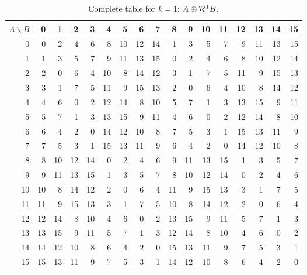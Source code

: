 \begin{table}[!htbp]\centering\small
\setlength{\tabcolsep}{5.0pt}\renewcommand{\arraystretch}{1.10}
\begin{tabular}{r|rrrrrrrrrrrrrrrr}\toprule
$A\backslash B$ & 0 & 1 & 2 & 3 & 4 & 5 & 6 & 7 & 8 & 9 & 10 & 11 & 12 & 13 & 14 & 15\\\midrule
0 & 0 & 2 & 4 & 6 & 8 & 10 & 12 & 14 & 1 & 3 & 5 & 7 & 9 & 11 & 13 & 15\\
1 & 1 & 3 & 5 & 7 & 9 & 11 & 13 & 15 & 0 & 2 & 4 & 6 & 8 & 10 & 12 & 14\\
2 & 2 & 0 & 6 & 4 & 10 & 8 & 14 & 12 & 3 & 1 & 7 & 5 & 11 & 9 & 15 & 13\\
3 & 3 & 1 & 7 & 5 & 11 & 9 & 15 & 13 & 2 & 0 & 6 & 4 & 10 & 8 & 14 & 12\\
4 & 4 & 6 & 0 & 2 & 12 & 14 & 8 & 10 & 5 & 7 & 1 & 3 & 13 & 15 & 9 & 11\\
5 & 5 & 7 & 1 & 3 & 13 & 15 & 9 & 11 & 4 & 6 & 0 & 2 & 12 & 14 & 8 & 10\\
6 & 6 & 4 & 2 & 0 & 14 & 12 & 10 & 8 & 7 & 5 & 3 & 1 & 15 & 13 & 11 & 9\\
7 & 7 & 5 & 3 & 1 & 15 & 13 & 11 & 9 & 6 & 4 & 2 & 0 & 14 & 12 & 10 & 8\\
8 & 8 & 10 & 12 & 14 & 0 & 2 & 4 & 6 & 9 & 11 & 13 & 15 & 1 & 3 & 5 & 7\\
9 & 9 & 11 & 13 & 15 & 1 & 3 & 5 & 7 & 8 & 10 & 12 & 14 & 0 & 2 & 4 & 6\\
10 & 10 & 8 & 14 & 12 & 2 & 0 & 6 & 4 & 11 & 9 & 15 & 13 & 3 & 1 & 7 & 5\\
11 & 11 & 9 & 15 & 13 & 3 & 1 & 7 & 5 & 10 & 8 & 14 & 12 & 2 & 0 & 6 & 4\\
12 & 12 & 14 & 8 & 10 & 4 & 6 & 0 & 2 & 13 & 15 & 9 & 11 & 5 & 7 & 1 & 3\\
13 & 13 & 15 & 9 & 11 & 5 & 7 & 1 & 3 & 12 & 14 & 8 & 10 & 4 & 6 & 0 & 2\\
14 & 14 & 12 & 10 & 8 & 6 & 4 & 2 & 0 & 15 & 13 & 11 & 9 & 7 & 5 & 3 & 1\\
15 & 15 & 13 & 11 & 9 & 7 & 5 & 3 & 1 & 14 & 12 & 10 & 8 & 6 & 4 & 2 & 0\\
\bottomrule\end{tabular}
\caption{Complete table for $k=1$: $A\oplus\mathcal R^1B$.}
\end{table}
\clearpage
